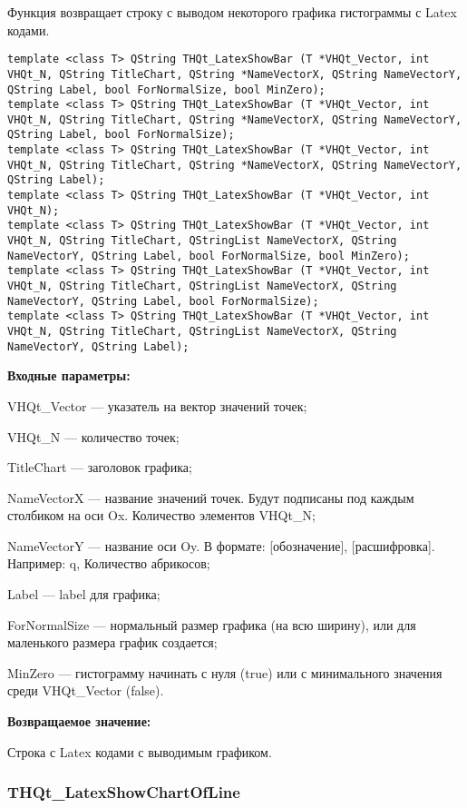 \documentclass[a4paper,12pt]{article}
\begin{document}
Функция возвращает строку с выводом некоторого графика гистограммы с Latex кодами.


\begin{lstlisting}[label=code_syntax_THQt_LatexShowBar,caption=Синтаксис]
template <class T> QString THQt_LatexShowBar (T *VHQt_Vector, int VHQt_N, QString TitleChart, QString *NameVectorX, QString NameVectorY, QString Label, bool ForNormalSize, bool MinZero);
template <class T> QString THQt_LatexShowBar (T *VHQt_Vector, int VHQt_N, QString TitleChart, QString *NameVectorX, QString NameVectorY, QString Label, bool ForNormalSize);
template <class T> QString THQt_LatexShowBar (T *VHQt_Vector, int VHQt_N, QString TitleChart, QString *NameVectorX, QString NameVectorY, QString Label);
template <class T> QString THQt_LatexShowBar (T *VHQt_Vector, int VHQt_N);
template <class T> QString THQt_LatexShowBar (T *VHQt_Vector, int VHQt_N, QString TitleChart, QStringList NameVectorX, QString NameVectorY, QString Label, bool ForNormalSize, bool MinZero);
template <class T> QString THQt_LatexShowBar (T *VHQt_Vector, int VHQt_N, QString TitleChart, QStringList NameVectorX, QString NameVectorY, QString Label, bool ForNormalSize);
template <class T> QString THQt_LatexShowBar (T *VHQt_Vector, int VHQt_N, QString TitleChart, QStringList NameVectorX, QString NameVectorY, QString Label);
\end{lstlisting}

\textbf{Входные параметры:}
 
VHQt\_Vector --- указатель на вектор значений точек;
 
VHQt\_N --- количество точек;
 
TitleChart --- заголовок графика;
 
NameVectorX --- название значений точек. Будут подписаны под каждым столбиком на оси Ox. Количество элементов VHQt\_N;
 
NameVectorY --- название оси Oy. В формате: [обозначение], [расшифровка]. Например: q, Количество абрикосов;
 
Label --- label для графика;
 
ForNormalSize --- нормальный размер графика (на всю ширину), или для маленького размера график создается;
 
MinZero --- гистограмму начинать с нуля (true) или с минимального значения среди VHQt\_Vector (false).
	
\textbf{Возвращаемое значение:}

Строка с Latex кодами с выводимым графиком.


\subsubsection{THQt\_LatexShowChartOfLine}\label{THQt_LatexShowChartOfLine}
\end{document}
